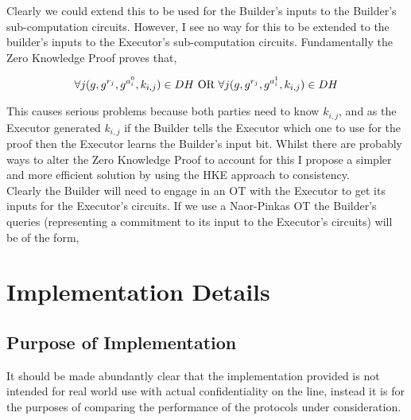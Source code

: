 \documentclass[ %
                    author={Nicholas Tutte},
                supervisor={Prof. Nigel Smart},
                    degree={MEng},
                     title={Secure Two Party Computation},
                  subtitle={A practical comparison of recent protocols},
                      type={Research - GG1K},
                      year={2015} ]{dissertation}
\begin{document}
				Clearly we could extend this to be used for the Builder's inputs to the Builder's sub-computation circuits. However, I see no way for this to be extended to the builder's inputs to the Executor's sub-computation circuits. Fundamentally the Zero Knowledge Proof proves that,
				
				$$\forall j (g, g^{r_j}, g^{a_i^0}, k_{i,j}) \in DH \textnormal{ OR } \forall j (g, g^{r_j}, g^{a_i^1}, k_{i,j}) \in DH$$
				
				This causes serious problems because both parties need to know $k_{i,j}$, and as the Executor generated $k_{i,j}$ if the Builder tells the Executor which one to use for the proof then the Executor learns the Builder's input bit. Whilst there are probably ways to alter the Zero Knowledge Proof to account for this I propose a simpler and more efficient solution by using the HKE approach to consistency.\\

				Clearly the Builder will need to engage in an OT with the Executor to get its inputs for the Executor's circuits. If we use a Naor-Pinkas OT the Builder's queries (representing a commitment to its input to the Executor's circuits) will be of the form,

% 
% 
% 

	\chapter{Implementation Details} \label{sec:ImplementationDetails}
		\section*{Purpose of Implementation}
			It should be made abundantly clear that the implementation provided is not intended for real world use with actual confidentiality on the line, instead it is for the purposes of comparing the performance of the protocols under consideration.\\
\end{document}
